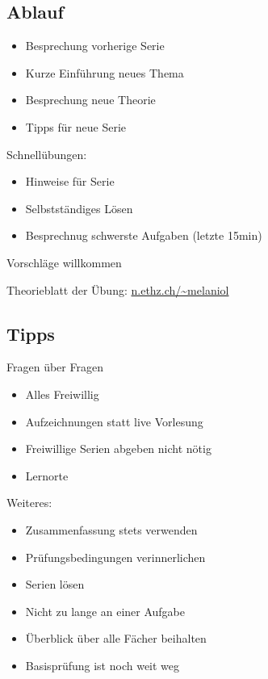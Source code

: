 \documentclass{article}
\begin{document}
    \subsection{Ablauf}
    \begin{itemize}
        \item Besprechung vorherige Serie
        \item Kurze Einführung neues Thema
        \item Besprechung neue Theorie
        \item Tipps für neue Serie
    \end{itemize}

    Schnellübungen:

    \begin{itemize}
        \item Hinweise für Serie
        \item Selbstständiges Lösen
        \item Besprechnug schwerste Aufgaben (letzte 15min)
    \end{itemize}

    Vorschläge willkommen

    Theorieblatt der Übung: \url{n.ethz.ch/~melaniol}

    \subsection{Tipps}

    Fragen über Fragen
    \begin{itemize}
        \item Alles Freiwillig
        \item Aufzeichnungen statt live Vorlesung
        \item Freiwillige Serien abgeben nicht nötig
        \item Lernorte
    \end{itemize}

    Weiteres:
    \begin{itemize}
        \item Zusammenfassung stets verwenden
        \item Prüfungsbedingungen verinnerlichen
        \item Serien lösen
        \item Nicht zu lange an einer Aufgabe
        \item Überblick über alle Fächer beihalten
        \item Basisprüfung ist noch weit weg
    \end{itemize}
\end{document}
